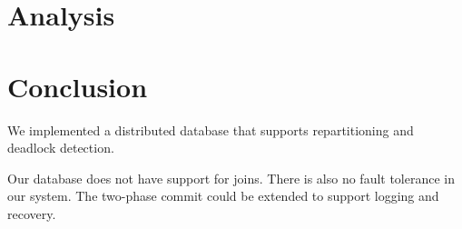 \documentclass[a4paper, 10pt, notitlepage]{report}
\begin{document}
\section*{Analysis}

\section*{Conclusion}
We implemented a distributed database that supports repartitioning and deadlock detection.

Our database does not have support for joins. There is also no fault tolerance in our system. The two-phase commit could be extended to support logging and recovery.

\begin{comment}
\chapter*{Bibliography}
%
\begin{description}

\item Author, I. (Year). \emph{Book Title}, Publisher; Place of publication.

\item Lamport, L. (1986), \emph{\LaTeX: A Document Preparation System}, Addison-Wesley; Reading, MA.

\item Author, I. (Year). `Journal article title', \emph{Journal}, \textbf{Vol}, pp.first--last.

\item Smith, A.D.A.C. and Wand, M.P. (2008). `Streamlined variance calculations for semiparametric
mixed models', \emph{Statistics in Medicine}, \textbf{27}, pp.435--48.

\end{description}
\end{comment}
\end{document}
